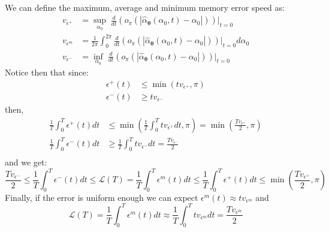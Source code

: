 \documentclass{article} %
\newcounter{ct}
\theoremstyle{definition}
\theoremstyle{remark}
\begin{document}
We can define the maximum, average and minimum memory error speed as:
\begin{equation}
\begin{split}
    v_{\epsilon^+} &= \sup_{\alpha_{0}} \; \frac{d}{dt} (o_{\pi} \left( \left| \hat{\alpha}_{\boldsymbol{\theta}}(\alpha_{0}, t) - \alpha_{0}  \right| \right)) |_{t = 0}  \\
    v_{\epsilon^{m}} &= \frac{1}{2 \pi} \int_{0}^{2 \pi} \frac{d}{dt} (o_{\pi} \left( \left| \hat{\alpha}_{\boldsymbol{\theta}}(\alpha_{0}, t) - \alpha_{0}  \right| \right))|_{t = 0} d\alpha_{0} \\
    v_{\epsilon^-} &= \inf_{\alpha_{0}} \; \frac{d}{dt} (o_{\pi} \left( \left| \hat{\alpha}_{\boldsymbol{\theta}}(\alpha_{0}, t) - \alpha_{0}  \right| \right))|_{t = 0}
\end{split}
\end{equation}
Notice then that since:
\begin{equation}
\begin{split}
    \epsilon^+(t) &\leq \min(t v_{\epsilon^+}, \pi) \\
    \epsilon^-(t) &\geq t v_{\epsilon^-}
\end{split}
\end{equation}then,
\begin{equation}
\begin{split}
    \frac{1}{T} \int_{0}^{T} \epsilon^+(t)dt &\leq  \min \left( \frac{1}{T} \int_{0}^{T} t v_{\epsilon^+} dt, \pi \right) = \min \left( \frac{T v_{\epsilon^+}}{2}, \pi \right) \\
    \frac{1}{T} \int_{0}^{T} \epsilon^-(t)dt &\geq  \frac{1}{T} \int_{0}^{T} tv_{\epsilon^-}dt  = \frac{T v_{\epsilon^-}}{2} \\
\end{split}
\end{equation}and we get:
\begin{equation}
    \frac{T v_{\epsilon^-}}{2} \leq \frac{1}{T} \int_{0}^{T} \epsilon^-(t)dt \leq \mathcal{L}(T) = \frac{1}{T} \int_{0}^{T} \epsilon^{m}(t) dt \leq  \frac{1}{T} \int_{0}^{T} \epsilon^+(t) dt \leq \min \left( \frac{T v_{\epsilon^+}}{2}, \pi \right)
\end{equation}
Finally, if the error is uniform enough we can expect \(\epsilon^{m}(t) \approx tv_{\epsilon^{m}}\) and
\begin{equation}
    \mathcal{L}(T) = \frac{1}{T} \int_{0}^{T} \epsilon^{m}(t) dt \approx  \frac{1}{T} \int_{0}^{T} t v_{\epsilon^{m}}dt = \frac{T v_{\epsilon^{m}}}{2}
\end{equation}
\end{document}
